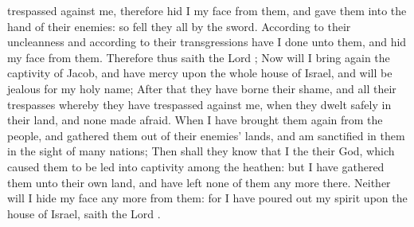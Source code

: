 {trespassed against me, therefore
hid I my
face from them, and
gave them into the
hand of their
enemies: so
fell they all by the
sword.
According to their
uncleanness and according to their
transgressions have I
done unto them, and
hid my
face from them.
Therefore thus
saith the
Lord
{}; Now will I bring
again the
captivity of
Jacob, and have
mercy upon the whole
house of
Israel, and will be
jealous for my
holy
name;
After that they have
borne their
shame, and all their
trespasses whereby they have
trespassed against me, when they
dwelt
safely in their
land, and none made
{}
afraid.
When I have brought them
again from the
people, and
gathered them out of their
enemies’
lands, and am
sanctified in them in the
sight of
many
nations;
Then shall they
know that I
{} the
{} their
God, which caused them to be led into
captivity among the
heathen: but I have
gathered them unto their own
land, and have
left none of them any more there.
Neither will I
hide my
face any more from them: for I have poured
out my
spirit upon the
house of
Israel,
saith the
Lord
{}.

}
